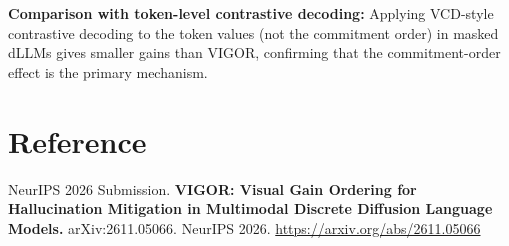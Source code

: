 \documentclass[10pt,twocolumn]{article}
\begin{document}
\textbf{Comparison with token-level contrastive decoding:} Applying VCD-style
contrastive decoding to the token values (not the commitment order) in masked
dLLMs gives smaller gains than VIGOR, confirming that the commitment-order
effect is the primary mechanism.

\section*{Reference}

NeurIPS 2026 Submission.
\textbf{VIGOR: Visual Gain Ordering for Hallucination Mitigation in Multimodal
Discrete Diffusion Language Models.}
arXiv:2611.05066. NeurIPS 2026.
\url{https://arxiv.org/abs/2611.05066}
\end{document}
